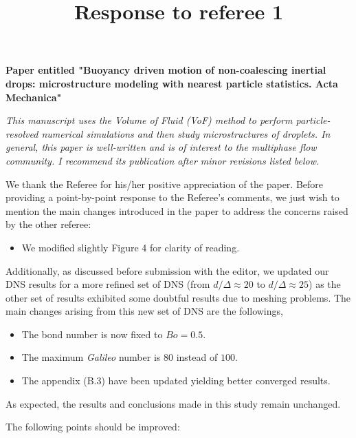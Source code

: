 \documentclass[10pt,a4paper]{article}
\begin{document}
\title{Response to referee 1} 
\maketitle
\textbf{Paper entitled "Buoyancy driven motion of non-coalescing inertial drops: microstructure modeling with nearest particle statistics.
Acta Mechanica"}
\bigskip

\textit{This manuscript uses the Volume of Fluid (VoF) method to perform particle-resolved numerical simulations and then study microstructures of droplets. In general, this paper is well-written and is of interest to the multiphase flow community. I recommend its publication after minor revisions listed below.}


\color{blue}
We thank the Referee for his/her positive appreciation of the paper. 
Before providing a point-by-point response to the Referee’s comments, we just wish to mention the main changes 
introduced in the paper to address the concerns raised by the other referee: 
\begin{itemize}
    \item  We modified slightly Figure 4 for clarity of reading. 
\end{itemize}

Additionally, as discussed before submission with the editor, we updated our DNS results for a more refined set of DNS (from $d/\Delta \approx 20$ to $d/\Delta \approx 25$) as the other set of results exhibited some doubtful results due to meshing problems. 
The main changes arising from this new set of DNS are the followings, 
\begin{itemize}
    \item The bond number is now fixed to $Bo = 0.5$. 
    \item The maximum \textit{Galileo} number is $80$ instead of $100$.
    \item The appendix (B.3) have been updated yielding better converged results. 
\end{itemize}  
As expected, the results and conclusions made in this study remain unchanged.
\color{black}

The following points should be improved:
\end{document}
